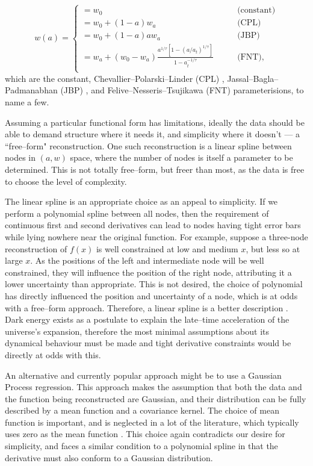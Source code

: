 \documentclass{article}
\begin{document}
\begin{equation}
  w(a) = 
  \begin{cases}
  = w_0 \qquad & \textrm{(constant)} \\
  = w_0 + (1-a) w_a \qquad & \textrm{(CPL)}\\
  = w_0 + (1-a)a w_a \qquad & \textrm{(JBP)}\\
  = w_a + (w_0-w_a) \frac{a^{1/\tau}[1-(a/a_t)^{1/\tau}]}{1-a_t^{-1/\tau}} \qquad & \textrm{(FNT),}\\
  \end{cases}
\end{equation}
%
which are the constant, Chevallier--Polarski--Linder (CPL) \cite{CPL_1, CPL_2}, Jassal--Bagla--Padmanabhan (JBP) \cite{JBP}, and Felive--Nesseris--Tsujikawa (FNT) \cite{FNT} parameterisions, to name a few.

Assuming a particular functional form has limitations, ideally the data should be able to demand structure where it needs it, and simplicity where it doesn't --- a ``free--form" reconstruction. One such reconstruction is a linear spline between nodes in $(a, w)$ space, where the number of nodes is itself a parameter to be determined. This is not totally free--form, but freer than most, as the data is free to choose the level of complexity.

The linear spline is an appropriate choice as an appeal to simplicity. If we perform a polynomial spline between all nodes, then the requirement of continuous first and second derivatives can lead to nodes having tight error bars while lying nowhere near the original function. For example, suppose a three-node reconstruction of $f(x)$ is well constrained at low and medium $x$, but less so at large $x$. As the positions of the left and intermediate node will be well constrained, they will influence the position of the right node, attributing it a lower uncertainty than appropriate. This is not desired, the choice of polynomial has directly influenced the position and uncertainty of a node, which is at odds with a free--form approach. Therefore, a linear spline is a better description \cite{Vazquez_2012_pk}. Dark energy exists as a postulate to explain the late--time acceleration of the universe's expansion, therefore the most minimal assumptions about its dynamical behaviour must be made and tight derivative constraints would be directly at odds with this.

An alternative and currently popular approach might be to use a Gaussian Process regression. This approach makes the assumption that both the data and the function being reconstructed are Gaussian, and their distribution can be fully described by a mean function and a covariance kernel. The choice of mean function is important, and is neglected in a lot of the literature, which typically uses zero as the mean function \cite{GP}. This choice again contradicts our desire for simplicity, and faces a similar condition to a polynomial spline in that the derivative must also conform to a Gaussian distribution.
\end{document}
